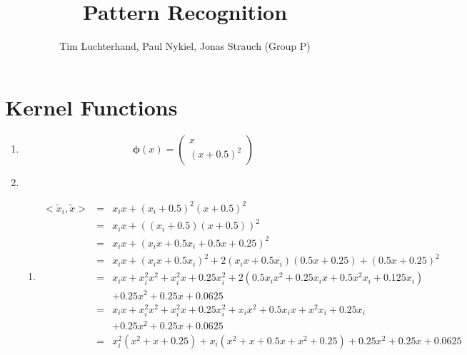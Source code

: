 \documentclass[DIN, pagenumber=false, fontsize=11pt, parskip=half]{scrartcl}
\title{Pattern Recognition}
\author{Tim Luchterhand, Paul Nykiel, Jonas Strauch (Group P)}
\begin{document}
    \maketitle
    \section{Kernel Functions}
    \begin{enumerate}
        \item 
            \begin{equation*}
                \bm{\phi}(x) = \begin{pmatrix} x \\ {(x + 0.5)}^2 \end{pmatrix}
            \end{equation*}
            \setcounter{enumi}{3}
        \item
            \begin{enumerate}[label=\alph*)]
                \item
                    \begin{eqnarray*}
                        <\tilde{x}_i, \tilde{x}>
                            &=& x_i x + {(x_i + 0.5)}^2 {(x + 0.5)}^2 \\
                            &=& x_i x + {\left((x_i + 0.5) (x + 0.5)\right)}^2 \\
                            &=& x_i x + {(x_i x + 0.5 x_i + 0.5 x + 0.25)}^2 \\
                            &=& x_i x + {(x_i x + 0.5 x_i)}^2 
                                + 2 (x_i x + 0.5 x_i) (0.5 x + 0.25)
                                + {(0.5 x + 0.25)}^2 \\
                            &=& x_i x + x_i^2 x^2 + x_i^2 x + 0.25 x_i^2
                                + 2 (0.5 x_i x^2 + 0.25 x_i x + 0.5 x^2 x_i + 0.125 x_i) \\
                                && + 0.25 x^2 + 0.25 x + 0.0625 \\
                            &=& x_i x + x_i^2 x^2 + x_i^2 x + 0.25 x_i^2
                                + x_i x^2 + 0.5 x_i x + x^2 x_i + 0.25 x_i \\
                                && + 0.25 x^2 + 0.25 x + 0.0625 \\
                            &=& x_i^2 (x^2 + x + 0.25)
                                + x_i (x^2 + x + 0.5 x + x^2 + 0.25)
                                + 0.25 x^2 + 0.25 x + 0.0625 \\

\end{eqnarray*}
\end{enumerate}
\end{enumerate}
\end{document}

